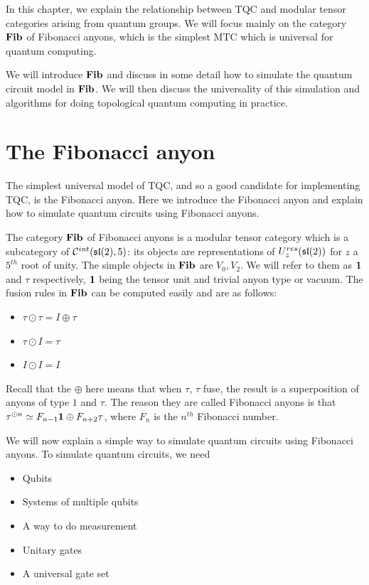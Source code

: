 In this chapter, we explain the relationship between TQC and modular tensor
categories arising from quantum groups. We will focus mainly on the category
$\mathbf{Fib}$ of Fibonacci anyons, which is the simplest MTC which is universal for
quantum computing. 

We will introduce $\mathbf{Fib}$ and discuss in some detail how to simulate the quantum
circuit model in $\mathbf{Fib}$. We will then discuss the universality of this
simulation and algorithms for doing topological quantum computing in practice.

\section{The Fibonacci anyon}
The simplest universal model of TQC, and so a good candidate for implementing
TQC, is the Fibonacci anyon. Here we introduce the Fibonacci anyon and explain
how to simulate quantum circuits using Fibonacci anyons.

The category $\mathbf{Fib}$ of Fibonacci anyons is a modular tensor category which is a
subcategory of $\mathcal{C}^{int}(\mathfrak{sl}(2),5)$: its objects are representations
of $U_z^{res}(\mathfrak{sl}(2))$ for $z$ a $5^{th}$ root of unity. The simple objects in 
$\mathbf{Fib}$ are $V_0, V_2$. We will refer to them as $\mathbf{1}$ and $\tau$
respectively, $\mathbf{1}$ being the tensor unit and trivial anyon type or vacuum. The
fusion rules in $\mathbf{Fib}$ can be computed easily and are as follows:

\begin{itemize}
    \item $\tau \odot \tau = I \oplus \tau$
    \item $\tau \odot I = \tau$
    \item $I \odot I = I$
\end{itemize}
Recall that the $\oplus$ here means that when $\tau$, $\tau$ fuse, the result
is a superposition of anyons of type $1$ and $\tau$.  The reason they are
called Fibonacci anyons is that $\tau^{\odot n} \simeq F_{n-1} \mathbf{1} \oplus F_{n+2}
\tau$, where $F_n$ is the $n^{th}$ Fibonacci number.

We will now explain a simple way to simulate quantum circuits using Fibonacci
anyons. To simulate quantum circuits, we need

\begin{itemize}
\item Qubits
\item Systems of multiple qubits
\item A way to do measurement
\item Unitary gates
\item A universal gate set
\end{itemize}

